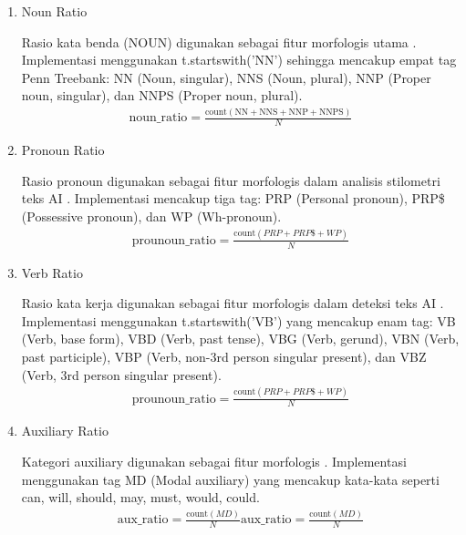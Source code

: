 \begin{enumerate}[label=\arabic*., leftmargin=*]
  \item Noun Ratio
  
  Rasio kata benda (NOUN) digunakan sebagai fitur morfologis utama \cite{Jaashan2025}. Implementasi menggunakan t.startswith('NN') sehingga mencakup empat tag Penn Treebank: NN (Noun, singular), NNS (Noun, plural), NNP (Proper noun, singular), dan NNPS (Proper noun, plural).
  \begin{equation}
  \label{eq:4}
  \begin{split}
\text{noun\_ratio}=\frac{\text{count}\left(\text{NN}+\text{NNS}+\text{NNP}+\text{NNPS}\right)}{N}
  \end{split}
  \end{equation}
  
  \item Pronoun Ratio
  
  Rasio pronoun digunakan sebagai fitur morfologis dalam analisis stilometri teks AI \cite{Jaashan2025}. Implementasi mencakup tiga tag: PRP (Personal pronoun), PRP\$ (Possessive pronoun), dan WP (Wh-pronoun).
  \begin{equation}
  \label{eq:5}
  \begin{split}
\text{prounoun\_ratio}=\frac{\text{count}\left(PRP+PRP\$+WP\right)}{N}
  \end{split}
  \end{equation}

  \item Verb Ratio
  
    Rasio kata kerja digunakan sebagai fitur morfologis dalam deteksi teks AI \cite{Jaashan2025}\cite{Irsyad2026}. Implementasi menggunakan t.startswith('VB') yang mencakup enam tag: VB (Verb, base form), VBD (Verb, past tense), VBG (Verb, gerund), VBN (Verb, past participle), VBP (Verb, non-3rd person singular present), dan VBZ (Verb, 3rd person singular present).
    \begin{equation}
  \label{eq:6}
  \begin{split}
\text{prounoun\_ratio}=\frac{\text{count}\left(PRP+PRP\$+WP\right)}{N}
  \end{split}
  \end{equation}

  \item Auxiliary Ratio
  
  Kategori auxiliary digunakan sebagai fitur morfologis \cite{Jaashan2025}. Implementasi menggunakan tag MD (Modal auxiliary) yang mencakup kata-kata seperti can, will, should, may, must, would, could.
  \begin{equation}
  \label{eq:7}
  \begin{split}
\text{aux\_ratio}=\frac{\text{count}\left(MD\right)}{N}\text{aux\_ratio}=\frac{\text{count}\left(MD\right)}{N}
  \end{split}
  \end{equation}


\end{enumerate}

